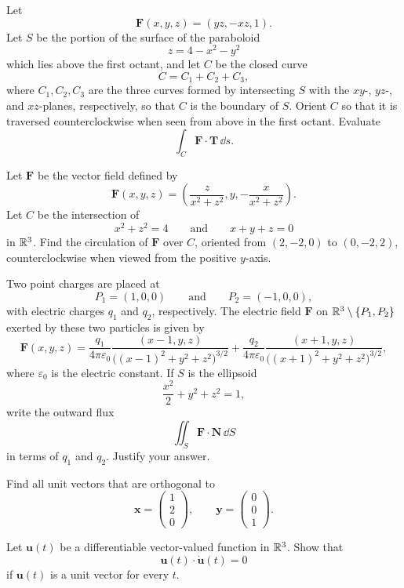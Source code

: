 \begin{problem}
Let
\[
\mathbf F(x,y,z)=(yz,-xz,1).
\]
Let $S$ be the portion of the surface of the paraboloid
\[
z=4-x^2-y^2
\]
which lies above the first octant, and let $C$ be the closed curve
\[
C=C_1+C_2+C_3,
\]
where $C_1,C_2,C_3$ are the three curves formed by intersecting $S$ with the $xy$-, $yz$-, and $xz$-planes, respectively, so that $C$ is the boundary of $S$. Orient $C$ so that it is traversed counterclockwise when seen from above in the first octant. Evaluate
\[
\int_C\mathbf F\cdot\mathbf T\,\dd s.
\]
\end{problem}

\begin{problem}
Let $\mathbf F$ be the vector field defined by
\[
\mathbf F(x,y,z)
=
\left(
\frac{z}{x^2+z^2},
 y,
-\frac{x}{x^2+z^2}
\right).
\]
Let $C$ be the intersection of
\[
x^2+z^2=4
\qquad\text{and}\qquad
x+y+z=0
\]
in $\mathbb{R}^3$. Find the circulation of $\mathbf F$ over $C$, oriented from $(2,-2,0)$ to $(0,-2,2)$, counterclockwise when viewed from the positive $y$-axis.
\end{problem}

\begin{problem}
Two point charges are placed at
\[
P_1=(1,0,0)
\qquad\text{and}\qquad
P_2=(-1,0,0),
\]
with electric charges $q_1$ and $q_2$, respectively. The electric field $\mathbf F$ on $\mathbb{R}^3\setminus\{P_1,P_2\}$ exerted by these two particles is given by
\[
\mathbf F(x,y,z)
=
\frac{q_1}{4\pi\varepsilon_0}
\frac{(x-1,y,z)}{\bigl((x-1)^2+y^2+z^2\bigr)^{3/2}}
+
\frac{q_2}{4\pi\varepsilon_0}
\frac{(x+1,y,z)}{\bigl((x+1)^2+y^2+z^2\bigr)^{3/2}},
\]
where $\varepsilon_0$ is the electric constant. If $S$ is the ellipsoid
\[
\frac{x^2}{2}+y^2+z^2=1,
\]
write the outward flux
\[
\iint_S\mathbf F\cdot\mathbf N\,\dd S
\]
in terms of $q_1$ and $q_2$. Justify your answer.
\end{problem}


\begin{problem}
\begin{problemsubparts}
\item Find all unit vectors that are orthogonal to
\[
\mathbf x=
\begin{pmatrix}1\\2\\0\end{pmatrix},
\qquad
\mathbf y=
\begin{pmatrix}0\\0\\1\end{pmatrix}.
\]
\item Let $\mathbf u(t)$ be a differentiable vector-valued function in $\mathbb{R}^3$. Show that
\[
\mathbf u(t)\cdot\dot{\mathbf u}(t)=0
\]
if $\mathbf u(t)$ is a unit vector for every $t$.
\end{problemsubparts}
\end{problem}

